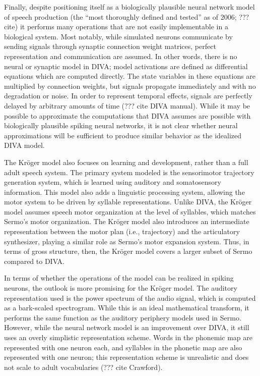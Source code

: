Finally, despite positioning itself as
a biologically plausible neural network model
of speech production
(the ``most thoroughly defined and tested''
as of 2006; ???cite)
it performs many operations
that are not easily implementable
in a biological system.
Most notably,
while simulated neurons communicate
by sending signals through
synaptic connection weight matrices,
perfect representation and communication
are assumed.
In other words, there is no neural
or synaptic model in DIVA;
model activations are defined as
differential equations
which are computed directly.
The state variables in these equations
are multiplied by connection weights,
but signals propagate immediately
and with no degradation or noise.
In order to represent temporal effects,
signals are perfectly delayed
by arbitrary amounts of time
(??? cite DIVA manual).
While it may be possible to approximate
the computations that
DIVA assumes are possible
with biologically plausible spiking neural networks,
it is not clear whether
neural approximations will
be sufficient to produce similar behavior
as the idealized DIVA model.

The Kr\"{o}ger model also
focuses on learning and development,
rather than a full adult speech system.
The primary system modeled
is the sensorimotor trajectory generation system,
which is learned using
auditory and somatosensory information.
This model also adds
a linguistic processing system,
allowing the motor system to be driven
by syllable representations.
Unlike DIVA, the Kr\"{o}ger model
assumes speech motor organization
at the level of syllables,
which matches Sermo's motor organization.
The Kr\"{o}ger model also
introduces an intermediate representation
between the motor plan (i.e., trajectory)
and the articulatory synthesizer,
playing a similar role as Sermo's
motor expansion system.
Thus, in terms of gross structure, then,
the Kr\"{o}ger model covers a larger subset
of Sermo compared to DIVA.


In terms of whether the operations
of the model can be realized in spiking neurons,
the outlook is more promising
for the Kr\"{o}ger model.
The auditory representation used
is the power spectrum of the audio signal,
which is computed as a bark-scaled spectrogram.
While this is an ideal mathematical transform,
it performs the same function as the
auditory periphery models used in Sermo.
However, while the neural network model
is an improvement over DIVA,
it still uses an overly simplistic
representation scheme.
Words in the phonemic map
are represented with one neuron each,
and syllables in the phonetic map
are also represented with one neuron;
this representation scheme is unrealistic
and  does not scale to adult vocabularies
(??? cite Crawford).

